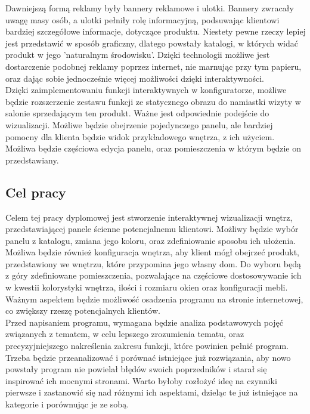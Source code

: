 \documentclass{article} %
\begin{document}
Dawniejszą formą reklamy były bannery reklamowe i ulotki. Bannery zwracały uwagę masy osób, a ulotki pełniły rolę informacyjną, podsuwając klientowi bardziej szczegółowe informacje, dotyczące produktu. Niestety pewne rzeczy lepiej jest przedstawić w sposób graficzny, dlatego powstały katalogi, w których widać produkt w jego 'naturalnym środowisku'. Dzięki technologii możliwe jest dostarczenie podobnej reklamy poprzez internet, nie marnując przy tym papieru, oraz dając sobie jednocześnie więcej możliwości dzięki interaktywności.
\\

Dzięki zaimplementowaniu funkcji interaktywnych w konfiguratorze, możliwe będzie rozszerzenie zestawu funkcji ze statycznego obrazu do namiastki wizyty w salonie sprzedającym ten produkt. Ważne jest odpowiednie podejście do wizualizacji. Możliwe będzie obejrzenie pojedynczego panelu, ale bardziej pomocny dla klienta będzie widok przykładowego wnętrza, z ich użyciem. Możliwa będzie częściowa edycja panelu, oraz pomieszczenia w którym będzie on przedstawiany.
\\


    \subsection{Cel pracy}
Celem tej pracy dyplomowej jest stworzenie interaktywnej wizualizacji wnętrz, przedstawiającej panele ścienne potencjalnemu klientowi. Możliwy będzie wybór panelu z katalogu, zmiana jego koloru, oraz zdefiniowanie sposobu ich ułożenia. Możliwa będzie również konfiguracja wnętrza, aby klient mógł obejrzeć produkt, przedstawiony we wnętrzu, które przypomina jego własny dom. Do wyboru będą z góry zdefiniowane pomieszczenia, pozwalające na częściowe dostosowywanie ich w kwestii kolorystyki wnętrza, ilości i rozmiaru okien oraz konfiguracji mebli. Ważnym aspektem będzie możliwość osadzenia programu na stronie internetowej, co zwiększy rzeszę potencjalnych klientów.
\\

Przed napisaniem programu, wymagana będzie analiza podstawowych pojęć związanych z tematem, w celu lepszego zrozumienia tematu, oraz precyzyjniejszego nakreślenia zakresu funkcji, które powinien pełnić program. Trzeba będzie przeanalizować i porównać istniejące już rozwiązania, aby nowo powstały program nie powielał błędów swoich poprzedników i starał się inspirować ich mocnymi stronami. Warto byłoby rozłożyć ideę na czynniki pierwsze i zastanowić się nad różnymi ich aspektami, dzieląc te już istniejące na kategorie i porównując je ze sobą.
\\
\end{document}
